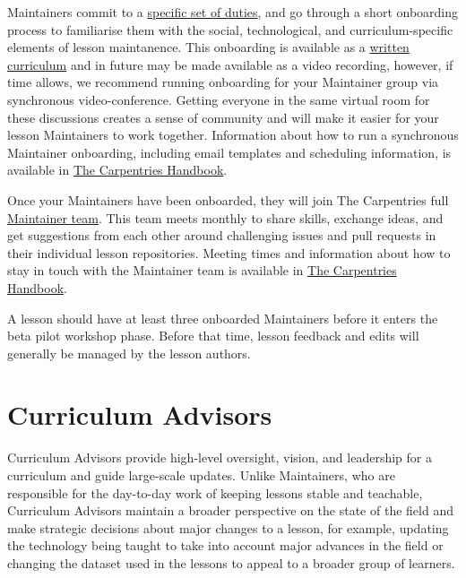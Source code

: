 \documentclass[]{book}
\begin{document}
Maintainers commit to a \href{https://docs.carpentries.org/topic_folders/maintainers/maintainers.html\#maintainer-guidelines}{specific set of duties}, and
go through a short onboarding process to familiarise them with the social,
technological, and curriculum-specific elements of lesson maintanence.
This onboarding is available as a \href{https://carpentries.github.io/maintainer-onboarding/}{written curriculum}
and in future may be made available as a video recording, however, if
time allows, we recommend running onboarding for your Maintainer group via
synchronous video-conference. Getting everyone in the same virtual room for
these discussions creates a sense of community and will make it easier for
your lesson Maintainers to work together. Information about how to run
a synchronous Maintainer onboarding, including email templates and
scheduling information, is available in \href{https://docs.carpentries.org/topic_folders/maintainers/maintainers.html\#maintainer-onboarding}{The Carpentries Handbook}.

Once your Maintainers have been onboarded, they will join The Carpentries
full \href{https://carpentries.org/maintainers/}{Maintainer team}. This team meets monthly to share
skills, exchange ideas, and get suggestions from each other around
challenging issues and pull requests in their individual lesson repositories.
Meeting times and information about how to stay in touch with the Maintainer
team is available in \href{https://docs.carpentries.org/topic_folders/maintainers/maintainers.html\#how-to-stay-in-touch}{The Carpentries Handbook}.

A lesson should have at least three onboarded Maintainers before it enters the
beta pilot workshop phase. Before that time, lesson feedback and edits will generally be
managed by the lesson authors.

\hypertarget{curriculum-advisors}{%
\section{Curriculum Advisors}\label{curriculum-advisors}}

Curriculum Advisors provide high-level oversight, vision, and leadership for a
curriculum and guide large-scale updates. Unlike Maintainers, who are responsible
for the day-to-day work of keeping lessons stable and teachable, Curriculum
Advisors maintain a broader perspective on the state of the field and make
strategic decisions about major changes to a lesson, for example, updating the
technology being taught to take into account major advances in the field or
changing the dataset used in the lessons to appeal to a broader group of learners.
\end{document}
